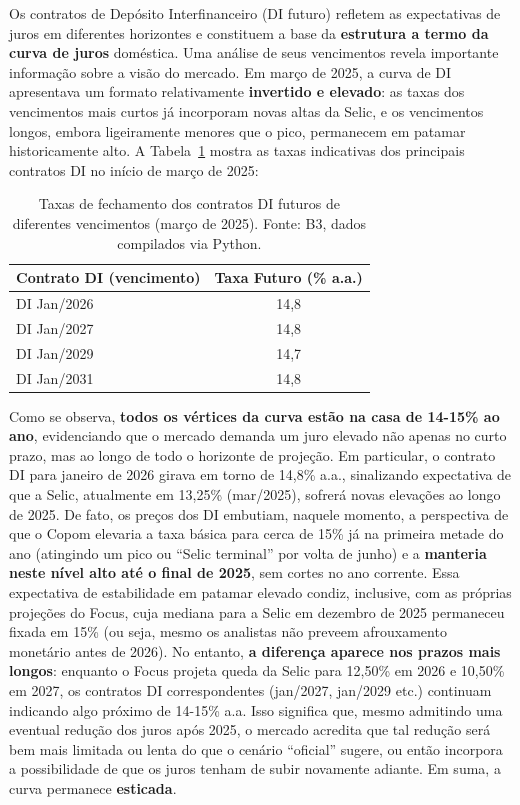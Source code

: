 \documentclass[a4paper,12pt]{article}
\begin{document}
Os contratos de Depósito Interfinanceiro (DI futuro) refletem as expectativas de juros em diferentes horizontes e constituem a base da \textbf{estrutura a termo da curva de juros} doméstica. Uma análise de seus vencimentos revela importante informação sobre a visão do mercado. Em março de 2025, a curva de DI apresentava um formato relativamente \textbf{invertido e elevado}: as taxas dos vencimentos mais curtos já incorporam novas altas da Selic, e os vencimentos longos, embora ligeiramente menores que o pico, permanecem em patamar historicamente alto. A Tabela~\ref{tab:DI} mostra as taxas indicativas dos principais contratos DI no início de março de 2025:

\begin{table}[H]
\centering
\begin{tabular}{lc}
\toprule
\textbf{Contrato DI (vencimento)} & \textbf{Taxa Futuro (\% a.a.)} \\
\midrule
DI Jan/2026 & 14,8 \\
DI Jan/2027 & 14,8 \\
DI Jan/2029 & 14,7 \\
DI Jan/2031 & 14,8 \\
\bottomrule
\end{tabular}
\caption{Taxas de fechamento dos contratos DI futuros de diferentes vencimentos (março de 2025). Fonte: B3, dados compilados via Python.}
\label{tab:DI}
\end{table}

Como se observa, \textbf{todos os vértices da curva estão na casa de 14-15\% ao ano}, evidenciando que o mercado demanda um juro elevado não apenas no curto prazo, mas ao longo de todo o horizonte de projeção. Em particular, o contrato DI para janeiro de 2026 girava em torno de 14,8\% a.a., sinalizando expectativa de que a Selic, atualmente em 13,25\% (mar/2025), sofrerá novas elevações ao longo de 2025. De fato, os preços dos DI embutiam, naquele momento, a perspectiva de que o Copom elevaria a taxa básica para cerca de 15\% já na primeira metade do ano (atingindo um pico ou ``Selic terminal'' por volta de junho) e a \textbf{manteria neste nível alto até o final de 2025}, sem cortes no ano corrente. Essa expectativa de estabilidade em patamar elevado condiz, inclusive, com as próprias projeções do Focus, cuja mediana para a Selic em dezembro de 2025 permaneceu fixada em 15\% (ou seja, mesmo os analistas não preveem afrouxamento monetário antes de 2026). No entanto, \textbf{a diferença aparece nos prazos mais longos}: enquanto o Focus projeta queda da Selic para 12,50\% em 2026 e 10,50\% em 2027, os contratos DI correspondentes (jan/2027, jan/2029 etc.) continuam indicando algo próximo de 14-15\% a.a. Isso significa que, mesmo admitindo uma eventual redução dos juros após 2025, o mercado acredita que tal redução será bem mais limitada ou lenta do que o cenário ``oficial'' sugere, ou então incorpora a possibilidade de que os juros tenham de subir novamente adiante. Em suma, a curva permanece \textbf{esticada}.
\end{document}
